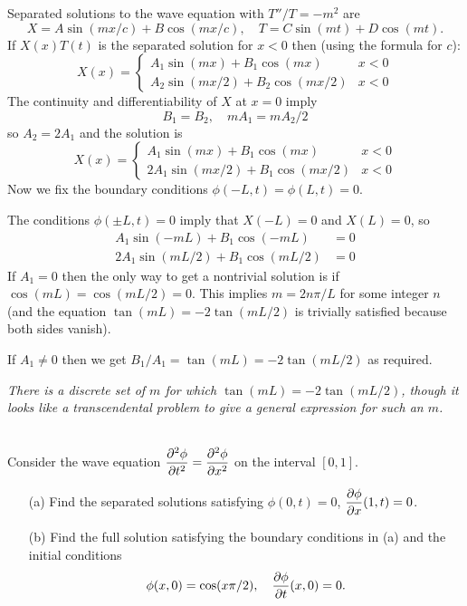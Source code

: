 \documentclass[12pt]{article}
\begin{document}
\begin{answer}
Separated solutions to the wave equation with $T''/T=-m^2$ are
\[X=A\sin(mx/c)+B\cos(mx/c),\quad T=C\sin(mt)+D\cos(mt).\]
If $X(x)T(t)$ is the separated solution for $x<0$ then (using the formula for $c$):
\[X(x)=\begin{cases}
A_1\sin(mx)+B_1\cos(mx)&x<0\\
A_2\sin(mx/2)+B_2\cos(mx/2)&x<0
\end{cases}
\]
The continuity and differentiability of $X$ at $x=0$ imply
\[B_1=B_2,\quad mA_1=mA_2/2\]
so $A_2=2A_1$ and the solution is
\[X(x)=\begin{cases}
A_1\sin(mx)+B_1\cos(mx)&x<0\\
2A_1\sin(mx/2)+B_1\cos(mx/2)&x<0
\end{cases}
\]
Now we fix the boundary conditions $\phi(-L,t)=\phi(L,t)=0$.

The conditions $\phi(\pm L,t)=0$ imply that $X(-L)=0$ and $X(L)=0$, so
\begin{align*}
A_1\sin(-mL)+B_1\cos(-mL)&=0\\
2A_1\sin(mL/2)+B_1\cos(mL/2)&=0
\end{align*}
If $A_1=0$ then the only way to get a nontrivial solution is if $\cos(mL)=\cos(mL/2)=0$. This implies $m=2n\pi/L$ for some integer $n$ (and the equation $\tan(mL)=-2\tan(mL/2)$ is trivially satisfied because both sides vanish).

If $A_1\neq 0$ then we get $B_1/A_1=\tan(mL)=-2\tan(mL/2)$ as required.

{\em There is a discrete set of $m$ for which $\tan(mL)=-2\tan(mL/2)$, though it looks like a transcendental problem to give a general expression for such an $m$.}
\end{answer}
\newpage

\bigskip


\begin{question}\ \\
Consider the wave equation $\dfrac{\partial^2 \phi}{\partial t^2}=\dfrac{\partial^2 \phi}{\partial x^2}$ on the interval $[0,1]$.
\begin{enumerate}
\item[(a)] Find the separated solutions satisfying $\phi(0,t)=0$, $\dfrac{\partial \phi}{\partial x}(1,t)=0$.
\item[(b)] Find the full solution satisfying the boundary conditions in (a) and the initial conditions
\[\phi(x,0)=\cos(x\pi/2),\quad \dfrac{\partial \phi}{\partial t}(x,0)=0.\]
\end{enumerate}
\end{question}
\end{document}
